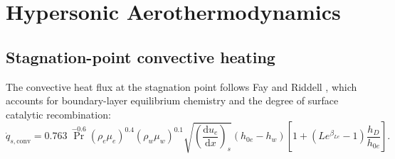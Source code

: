 \documentclass[11pt,a4paper]{article}
\theoremstyle{definition}
\numberwithin{equation}{section}
\newcommand{\diff}{\mathrm{d}}
\begin{document}
\section{Hypersonic Aerothermodynamics}
\label{sec:aerothermo}

\subsection{Stagnation-point convective heating}
\label{sec:convective}

The convective heat flux at the stagnation point follows Fay and Riddell \cite{fay1958}, which accounts for boundary-layer equilibrium chemistry and the degree of surface catalytic recombination:
\begin{equation}
\label{eq:fayriddell}
\dot{q}_{s,\text{conv}} = 0.763\, \Pr^{-0.6} (\rho_e \mu_e)^{0.4} (\rho_w \mu_w)^{0.1}
\sqrt{\left(\frac{\diff u_e}{\diff x}\right)_{\!s}}
\left( h_{0e} - h_w \right)
\left[ 1 + \left(Le^{\beta_{Le}} - 1\right)\frac{h_D}{h_{0e}} \right].
\end{equation}
\end{document}
